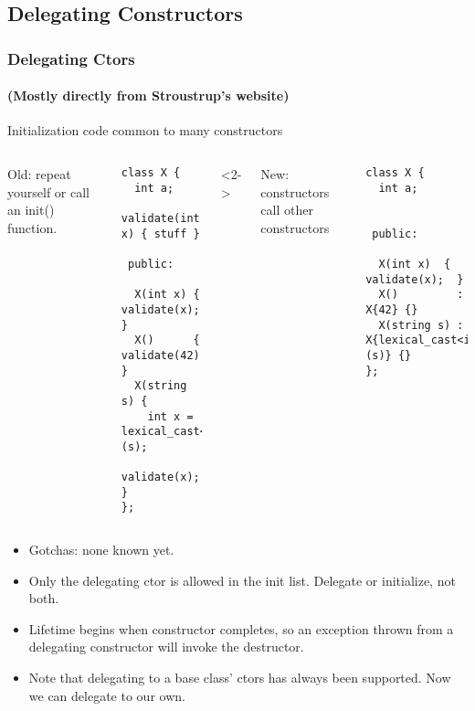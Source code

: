
\subsection{Delegating Constructors}
\lyxframeend{}


\begin{frame}[fragile]
\frametitle{Delegating Ctors}
\framesubtitle{(Mostly directly from Stroustrup's website)}
Initialization code common to many constructors
\begin{columns}[t]
{\scriptsize
Old: repeat yourself or call an init() function.
\begin{verbatim}
class X {
  int a;
  validate(int x) { stuff }

 public:

  X(int x) { validate(x); }
  X()      { validate(42); }
  X(string s) { 
    int x = lexical_cast<int>(s);
    validate(x);      }
};
\end{verbatim}
}
<2->
{\scriptsize
New: constructors call other constructors

\begin{verbatim}
class X {
  int a;


 public:

  X(int x)  { validate(x);  }
  X()         : X{42} {}
  X(string s) : X{lexical_cast<int>(s)} {}
};
\end{verbatim}
}
\end{columns}

\pause{}

\begin{itemize}
\item Gotchas: none known yet.
\item Only the delegating ctor is allowed in the init list.  Delegate
  or initialize, not both.
\item Lifetime begins when  constructor completes,
  so an exception thrown from a
  delegating constructor will invoke the destructor.

\item Note that delegating to a base class' ctors has always been
supported.  Now we can delegate to our own.

\end{itemize}
\end{frame}

